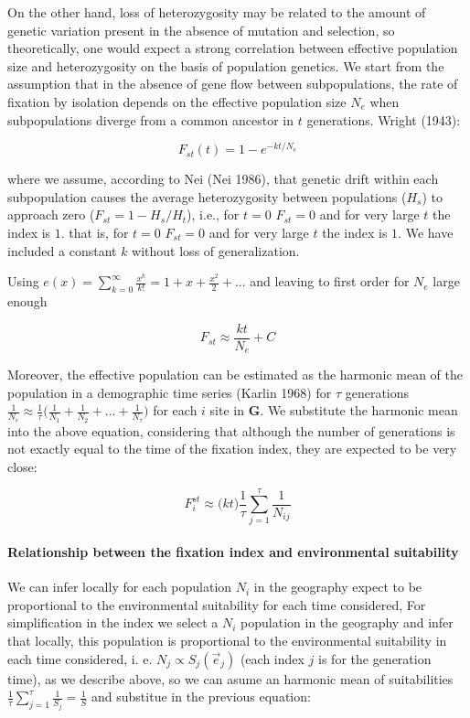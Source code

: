\documentclass[
]{article}
\begin{document}
On the other hand, loss of heterozygosity may be related to the amount
of genetic variation present in the absence of mutation and selection,
so theoretically, one would expect a strong correlation between
effective population size and heterozygosity on the basis of population
genetics. We start from the assumption that in the absence of gene flow
between subpopulations, the rate of fixation by isolation depends on the
effective population size \(N_e\) when subpopulations diverge from a
common ancestor in \(t\) generations. Wright (1943):

\[
F_{st}(t) = 1 - e^{-kt/N_e } 
\]

where we assume, according to Nei (Nei 1986), that genetic drift within
each subpopulation causes the average heterozygosity between populations
(\(H_s\)) to approach zero (\(F_{st} = 1 - H_s/H_t\)), i.e., for \(t=0\)
\(F_{st} = 0\) and for very large \(t\) the index is \(1\). that is, for
\(t=0\) \(F_{st} = 0\) and for very large \(t\) the index is \(1\). We
have included a constant \(k\) without loss of generalization.

Using
\(e(x) = \sum_{k=0}^{\infty} \frac{x^k}{k!} = 1 + x + \frac{x^2}{2} + ...\)
and leaving to first order for \(N_e\) large enough

\[
F_{st} \approx \frac{kt}{N_e} + C
\]

Moreover, the effective population can be estimated as the harmonic mean
of the population in a demographic time series (Karlin 1968) for
\(\tau\) generations
\(\frac{1}{N_e} \approx \frac{1}{\tau}\Big({\frac{1}{N_1} + \frac{1}{N_2} + ... + \frac{1}{N_\tau} } \Big)\)
for each \(i\) site in \(\mathbf{G}\). We substitute the harmonic mean
into the above equation, considering that although the number of
generations is not exactly equal to the time of the fixation index, they
are expected to be very close:

\[
F_{i}^{st} \approx \Big (kt\Big)  \frac{1}{\tau}\sum_{j=1}^{\tau}\frac{1}{N_{ij}} 
\]

\hypertarget{relationship-between-the-fixation-index-and-environmental-suitability}{%
\paragraph{Relationship between the fixation index and environmental
suitability}\label{relationship-between-the-fixation-index-and-environmental-suitability}}

We can infer locally for each population \(N_i\) in the geography expect
to be proportional to the environmental suitability for each time
considered, For simplification in the index we select a \(N_i\)
population in the geography and infer that locally, this population is
proportional to the environmental suitability in each time considered,
i. e. \(N_{j} \propto S_{j}(\vec{e}_{j})\) (each index \(j\) is for the
generation time), as we describe above, so we can asume an harmonic mean
of suitabilities
\(\frac{1}{\tau}\sum_{j = 1}^{\tau} \frac{1}{S_j} = \frac{1}{S}\) and
substitue in the previous equation:
\end{document}
